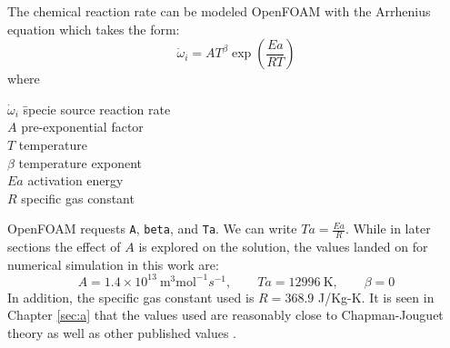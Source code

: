 The chemical reaction rate can be modeled OpenFOAM with the Arrhenius equation \cite{christ} which takes the form: 
\begin{equation}
\dot{\omega}_i = AT^\beta \exp\left(\frac{Ea}{R T}\right)
\end{equation}
where 
\begin{tabbing}
\qquad \= \(\dot{\omega}_i\) \qquad \= specie source reaction rate \\ 
\> \(A\) \> pre-exponential factor \\
\> \(T\) \> temperature \\
\> \(\beta\) \> temperature exponent \\
\> \(Ea\) \> activation energy \\
\> \(R\) \> specific gas constant 
\end{tabbing}

\noindent OpenFOAM requests \verb|A|, \verb|beta|, and \verb|Ta|. We can write \(Ta = \frac{Ea}{R }\). While in later sections the effect of \(A\) is explored on the solution, the values landed on for numerical simulation in this work are:
\begin{equation}
   A = 1.4 \times 10^{13} ~ \text{m}^3\text{mol}^{-1}s^{-1},
   \qquad 
   Ta = 12996 ~\text{K},
   \qquad
   \beta = 0
\end{equation}
\noindent In addition, the specific gas constant used is \(R = 368.9\) J/Kg-K. It is seen in Chapter \ref{sec:a} that the values used are reasonably close to Chapman-Jouguet theory as well as other published values \cite{towery1}\cite{hashemi}. 





